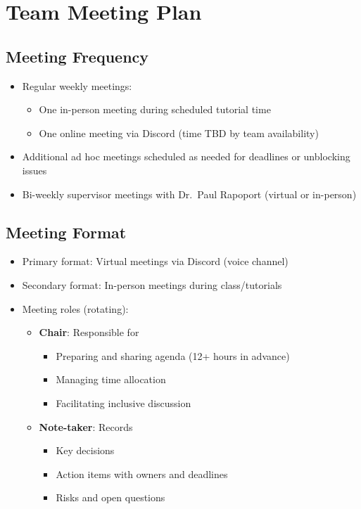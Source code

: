 \documentclass{article}
\begin{document}

\section{Team Meeting Plan}

\subsection*{Meeting Frequency}
\begin{itemize}
  \item Regular weekly meetings:
  \begin{itemize}
    \item One in-person meeting during scheduled tutorial time
    \item One online meeting via Discord (time TBD by team availability)
  \end{itemize}
  \item Additional ad hoc meetings scheduled as needed for deadlines or unblocking issues
  \item Bi-weekly supervisor meetings with Dr.~Paul Rapoport (virtual or in-person)
\end{itemize}

\subsection*{Meeting Format}
\begin{itemize}
  \item Primary format: Virtual meetings via Discord (voice channel)
  \item Secondary format: In-person meetings during class/tutorials
  \item Meeting roles (rotating):
  \begin{itemize}
    \item \textbf{Chair}: Responsible for
    \begin{itemize}
      \item Preparing and sharing agenda (12+ hours in advance)
      \item Managing time allocation
      \item Facilitating inclusive discussion
    \end{itemize}
  \item \textbf{Note-taker}: Records
    \begin{itemize}
      \item Key decisions
      \item Action items with owners and deadlines
      \item Risks and open questions
    \end{itemize}
  \end{itemize}
\end{itemize}
\end{document}
